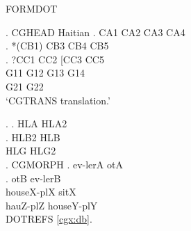 
\GlossPhantomAlign
\GlossMorphAlign

\noindent FORMDOT

\ex. CGHEAD Haitian
\ag. \ok CA1 CA2 CA3 CA4 {} \\
\bg.\label{cgx:db} *(CB1) {} CB3 CB4 CB5\\
\cg. ?CC1 CC2 [CC3 {} CC5\\
\CommonGloss G11 G12 G13 G14\\
\CommonGloss G21 G22\\
\glt `CGTRANS translation.'

\ex.
\ag. HLA HLA2\\
\bg. HLB2 HLB\\
\CommonGloss HLG HLG2\\

\ex. CGMORPH
\ag. ev-lerA otA\\
\bg. otB ev-lerB\\
\CommonGloss houseX-plX sitX\\
\CommonGloss hauZ-plZ houseY-plY\\

\noindent DOTREFS \ref{cgx:db}.
\newpage

